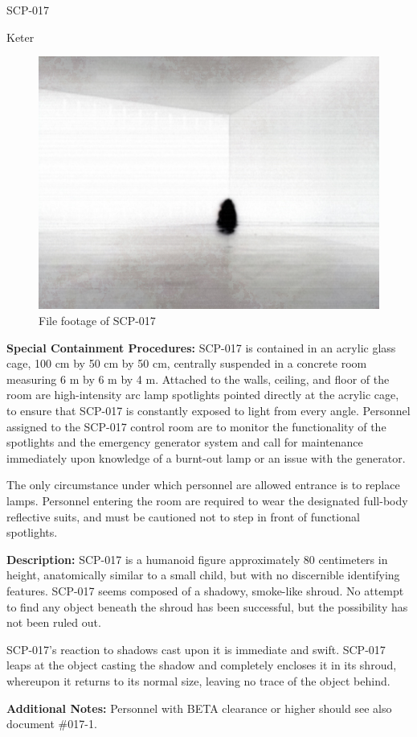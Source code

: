 
 SCP-017

 Keter

\begin{figure}[h]
\begin{center}
\includegraphics[scale=0.5]{scp/017.jpg}
\linebreak File footage of SCP-017
\end{center}
\end{figure}

\textbf{Special Containment Procedures:} SCP-017 is contained in an acrylic glass cage, 100 cm by 50 cm by 50 cm, centrally suspended in a concrete room measuring 6 m by 6 m by 4 m. Attached to the walls, ceiling, and floor of the room are high-intensity arc lamp spotlights pointed directly at the acrylic cage, to ensure that SCP-017 is constantly exposed to light from every angle. Personnel assigned to the SCP-017 control room are to monitor the functionality of the spotlights and the emergency generator system and call for maintenance immediately upon knowledge of a burnt-out lamp or an issue with the generator.

The only circumstance under which personnel are allowed entrance is to replace lamps. Personnel entering the room are required to wear the designated full-body reflective suits, and must be cautioned not to step in front of functional spotlights.

\textbf{Description:} SCP-017 is a humanoid figure approximately 80 centimeters in height, anatomically similar to a small child, but with no discernible identifying features. SCP-017 seems composed of a shadowy, smoke-like shroud. No attempt to find any object beneath the shroud has been successful, but the possibility has not been ruled out.

SCP-017's reaction to shadows cast upon it is immediate and swift. SCP-017 leaps at the object casting the shadow and completely encloses it in its shroud, whereupon it returns to its normal size, leaving no trace of the object behind.

\textbf{Additional Notes:} Personnel with BETA clearance or higher should see also document \#017-1.